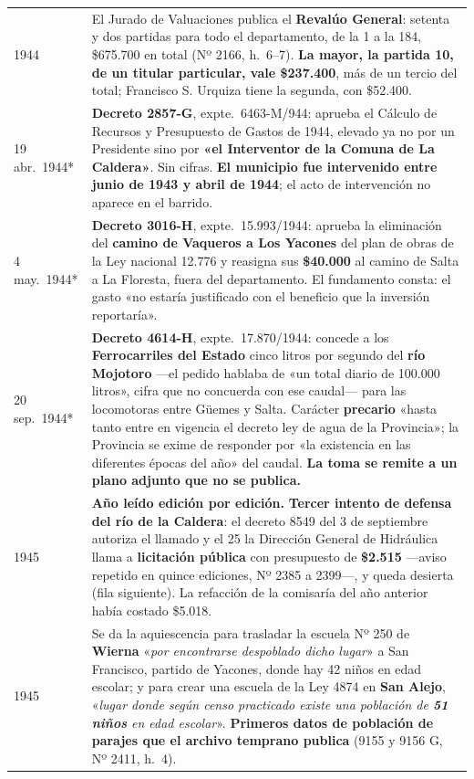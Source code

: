 \begin{longtable}{@{}p{2.7cm}p{10.3cm}@{}}
1944 & El Jurado de Valuaciones publica el \textbf{Revalúo General}: setenta y dos partidas para todo el departamento, de la 1 a la 184, \$675.700 en total (Nº 2166, h.\ 6--7). \textbf{La mayor, la partida 10, de un titular particular, vale \$237.400}, más de un tercio del total; Francisco S. Urquiza\index{Urquiza, Francisco S.} tiene la segunda, con \$52.400. \\
19 abr.\ 1944* & \textbf{Decreto 2857-G}, expte.\ 6463-M/944: aprueba el Cálculo de Recursos y Presupuesto de Gastos de 1944, elevado ya no por un Presidente sino por \textbf{«el Interventor de la Comuna de La Caldera»}. Sin cifras. \textbf{El municipio fue intervenido entre junio de 1943 y abril de 1944}; el acto de intervención no aparece en el barrido. \\
4 may.\ 1944* & \textbf{Decreto 3016-H}, expte.\ 15.993/1944: aprueba la eliminación del \textbf{camino de Vaqueros a Los Yacones} del plan de obras de la Ley nacional 12.776 y reasigna sus \textbf{\$40.000} al camino de Salta a La Floresta, fuera del departamento. El fundamento consta: el gasto «no estaría justificado con el beneficio que la inversión reportaría». \\
20 sep.\ 1944* & \textbf{Decreto 4614-H}, expte.\ 17.870/1944: concede a los \textbf{Ferrocarriles del Estado} cinco litros por segundo del \textbf{río Mojotoro} ---el pedido hablaba de «un total diario de 100.000 litros», cifra que no concuerda con ese caudal--- para las locomotoras entre Güemes y Salta. Carácter \textbf{precario} «hasta tanto entre en vigencia el decreto ley de agua de la Provincia»; la Provincia se exime de responder por «la existencia en las diferentes épocas del año» del caudal. \textbf{La toma se remite a un plano adjunto que no se publica.} \\
1945 & \textbf{Año leído edición por edición.} \textbf{Tercer intento de defensa del río de la Caldera}: el decreto 8549 del 3 de septiembre autoriza el llamado y el 25 la Dirección General de Hidráulica llama a \textbf{licitación pública} con presupuesto de \textbf{\$2.515} ---aviso repetido en quince ediciones, Nº 2385 a 2399---, y queda desierta (fila siguiente). La refacción de la comisaría del año anterior había costado \$5.018. \\
1945 & Se da la aquiescencia para trasladar la escuela Nº 250 de \textbf{Wierna} «\textit{por encontrarse despoblado dicho lugar}» a San Francisco, partido de Yacones, donde hay 42 niños en edad escolar; y para crear una escuela de la Ley 4874 en \textbf{San Alejo}, «\textit{lugar donde según censo practicado existe una población de \textbf{51 niños} en edad escolar}». \textbf{Primeros datos de población de parajes que el archivo temprano publica} (9155 y 9156 G, Nº 2411, h.\ 4). \\

\end{longtable}

